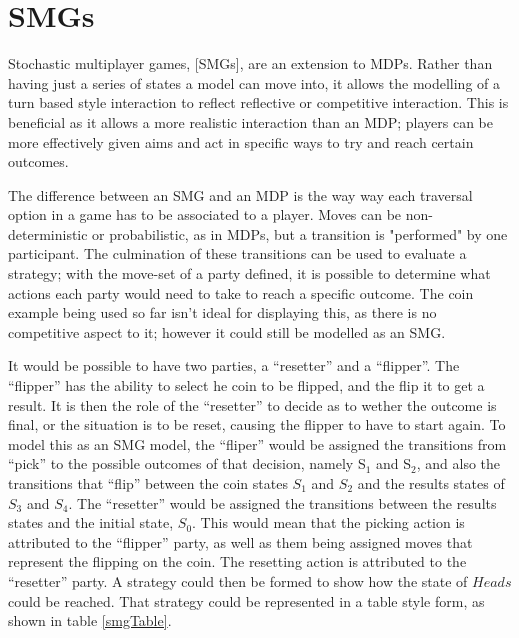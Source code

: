 \documentclass{l4proj}
\begin{document}


\section{SMGs}


Stochastic multiplayer games, [SMGs], are an extension to MDPs. Rather than having just a series of states a model can move into, it allows the modelling of a turn based style interaction to reflect reflective or competitive interaction. This is beneficial as it allows a more realistic interaction than an MDP; players can be more effectively given aims and act in specific ways to try and reach certain outcomes. 

The difference between an SMG and an MDP is the way way each traversal option in a game has to be associated to a player. Moves can be non-deterministic or probabilistic, as in MDPs, but a transition is "performed" by one participant. The culmination of these transitions can be used to evaluate a strategy; with the move-set of a party defined, it is possible to determine what actions each party would need to take to reach a specific outcome. The coin example being used so far isn't ideal for displaying this, as there is no competitive aspect to it; however it could still be modelled as an SMG.

It would be possible to have two parties, a ``resetter'' and a ``flipper''. The ``flipper'' has the ability to select he coin to be flipped, and the flip it to get a result. It is then the role of the ``resetter'' to decide as to wether the outcome is final, or the situation is to be reset, causing the flipper to have to start again. To model this as an SMG model, the ``fliper'' would be assigned the transitions from ``pick'' to the possible outcomes of that decision, namely S$_1$ and S$_2$, and also the transitions that ``flip'' between the coin states $S_1$ and $S_2$ and the results states of $S_3$ and $S_4$. The ``resetter'' would be assigned the transitions between the results states and the initial state, $S_0$. This would mean that the picking action is attributed to the ``flipper'' party, as well as them being assigned moves that represent the flipping on the coin. The resetting action is attributed to the ``resetter'' party.  A strategy could then be formed to show how the state of $Heads$ could be reached. That strategy could be represented in a table style form, as shown in table \ref{smgTable}. 
\end{document}
